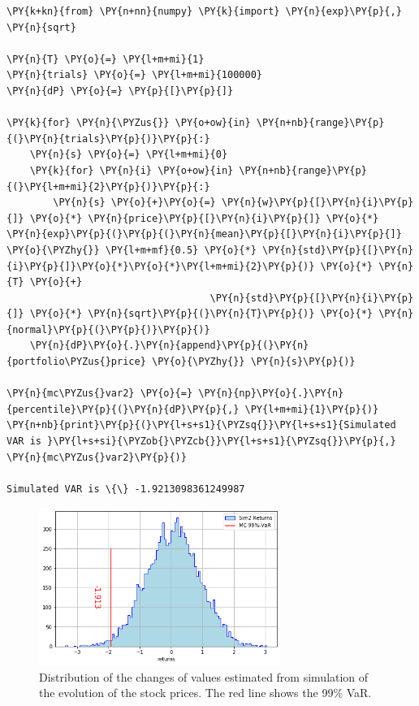 \begin{tcolorbox}[breakable, size=fbox, boxrule=1pt, pad at break*=1mm,colback=cellbackground, colframe=cellborder]
\begin{Verbatim}[commandchars=\\\{\}]
\PY{k+kn}{from} \PY{n+nn}{numpy} \PY{k}{import} \PY{n}{exp}\PY{p}{,} \PY{n}{sqrt}
		
\PY{n}{T} \PY{o}{=} \PY{l+m+mi}{1}
\PY{n}{trials} \PY{o}{=} \PY{l+m+mi}{100000}
\PY{n}{dP} \PY{o}{=} \PY{p}{[}\PY{p}{]}
		
\PY{k}{for} \PY{n}{\PYZus{}} \PY{o+ow}{in} \PY{n+nb}{range}\PY{p}{(}\PY{n}{trials}\PY{p}{)}\PY{p}{:}
    \PY{n}{s} \PY{o}{=} \PY{l+m+mi}{0}
    \PY{k}{for} \PY{n}{i} \PY{o+ow}{in} \PY{n+nb}{range}\PY{p}{(}\PY{l+m+mi}{2}\PY{p}{)}\PY{p}{:}
        \PY{n}{s} \PY{o}{+}\PY{o}{=} \PY{n}{w}\PY{p}{[}\PY{n}{i}\PY{p}{]} \PY{o}{*} \PY{n}{price}\PY{p}{[}\PY{n}{i}\PY{p}{]} \PY{o}{*} \PY{n}{exp}\PY{p}{(}\PY{p}{(}\PY{n}{mean}\PY{p}{[}\PY{n}{i}\PY{p}{]} \PY{o}{\PYZhy{}} \PY{l+m+mf}{0.5} \PY{o}{*} \PY{n}{std}\PY{p}{[}\PY{n}{i}\PY{p}{]}\PY{o}{*}\PY{o}{*}\PY{l+m+mi}{2}\PY{p}{)} \PY{o}{*} \PY{n}{T} \PY{o}{+} 
                                   \PY{n}{std}\PY{p}{[}\PY{n}{i}\PY{p}{]} \PY{o}{*} \PY{n}{sqrt}\PY{p}{(}\PY{n}{T}\PY{p}{)} \PY{o}{*} \PY{n}{normal}\PY{p}{(}\PY{p}{)}\PY{p}{)}
    \PY{n}{dP}\PY{o}{.}\PY{n}{append}\PY{p}{(}\PY{n}{portfolio\PYZus{}price} \PY{o}{\PYZhy{}} \PY{n}{s}\PY{p}{)}
		
\PY{n}{mc\PYZus{}var2} \PY{o}{=} \PY{n}{np}\PY{o}{.}\PY{n}{percentile}\PY{p}{(}\PY{n}{dP}\PY{p}{,} \PY{l+m+mi}{1}\PY{p}{)}
\PY{n+nb}{print}\PY{p}{(}\PY{l+s+s1}{\PYZsq{}}\PY{l+s+s1}{Simulated VAR is }\PY{l+s+si}{\PYZob{}\PYZcb{}}\PY{l+s+s1}{\PYZsq{}}\PY{p}{,} \PY{n}{mc\PYZus{}var2}\PY{p}{)}

Simulated VAR is \{\} -1.9213098361249987
\end{Verbatim}
\end{tcolorbox}

\begin{figure}[htb]
	\centering
	\includegraphics[width=0.7\textwidth]{figures/sim2_var}
	\caption{Distribution of the changes of values estimated from simulation of the evolution of the stock prices. The red line shows the 99\% VaR.}
	\label{fig:mc2_var}
\end{figure}


